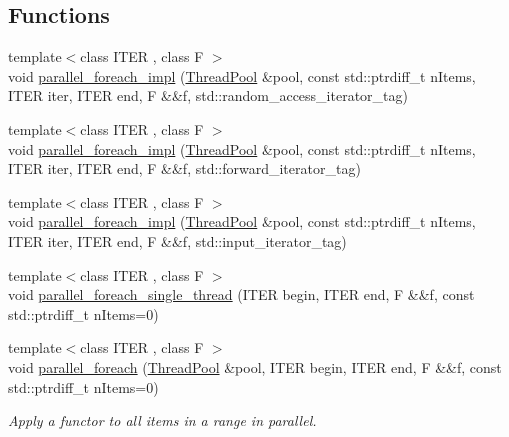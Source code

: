 \subsection*{Functions}
\begin{DoxyCompactItemize}
\item 
{\footnotesize template$<$class I\+T\+ER , class F $>$ }\\void \hyperlink{group__ParallelProcessing_ga7604490d8cf7a5b53de4477c866c8b86}{parallel\+\_\+foreach\+\_\+impl} (\hyperlink{classnifty_1_1parallel_1_1ThreadPool}{Thread\+Pool} \&pool, const std\+::ptrdiff\+\_\+t n\+Items, I\+T\+ER iter, I\+T\+ER end, F \&\&f, std\+::random\+\_\+access\+\_\+iterator\+\_\+tag)
\item 
{\footnotesize template$<$class I\+T\+ER , class F $>$ }\\void \hyperlink{group__ParallelProcessing_gab81648beb53aff67df1822f993b49ad1}{parallel\+\_\+foreach\+\_\+impl} (\hyperlink{classnifty_1_1parallel_1_1ThreadPool}{Thread\+Pool} \&pool, const std\+::ptrdiff\+\_\+t n\+Items, I\+T\+ER iter, I\+T\+ER end, F \&\&f, std\+::forward\+\_\+iterator\+\_\+tag)
\item 
{\footnotesize template$<$class I\+T\+ER , class F $>$ }\\void \hyperlink{group__ParallelProcessing_ga402d9e45f8edf065e6775e76a447f72e}{parallel\+\_\+foreach\+\_\+impl} (\hyperlink{classnifty_1_1parallel_1_1ThreadPool}{Thread\+Pool} \&pool, const std\+::ptrdiff\+\_\+t n\+Items, I\+T\+ER iter, I\+T\+ER end, F \&\&f, std\+::input\+\_\+iterator\+\_\+tag)
\item 
{\footnotesize template$<$class I\+T\+ER , class F $>$ }\\void \hyperlink{group__ParallelProcessing_ga53b7128ccb1cf52e5646440337ce4ece}{parallel\+\_\+foreach\+\_\+single\+\_\+thread} (I\+T\+ER begin, I\+T\+ER end, F \&\&f, const std\+::ptrdiff\+\_\+t n\+Items=0)
\item 
{\footnotesize template$<$class I\+T\+ER , class F $>$ }\\void \hyperlink{group__ParallelProcessing_ga505ac3d12ecde87341bce7b6f1027c88}{parallel\+\_\+foreach} (\hyperlink{classnifty_1_1parallel_1_1ThreadPool}{Thread\+Pool} \&pool, I\+T\+ER begin, I\+T\+ER end, F \&\&f, const std\+::ptrdiff\+\_\+t n\+Items=0)
\begin{DoxyCompactList}\small\item\em Apply a functor to all items in a range in parallel. \end{DoxyCompactList}\item 

\end{DoxyCompactItemize}
